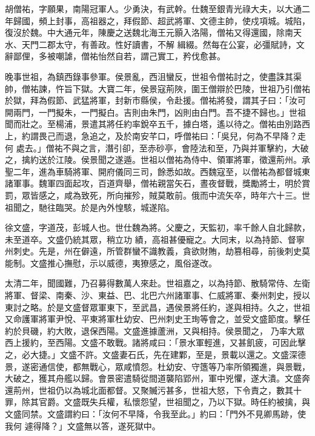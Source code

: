 
\begin{pinyinscope}

 胡僧祐，字願果，南陽冠軍人。少勇決，有武幹。仕魏至銀青光祿大夫，以大通二年歸國，頻上封事，高祖器之，拜假節、超武將軍、文德主帥，使戍項城。城陷，復沒於魏。中大通元年，陳慶之送魏北海王元顥入洛陽，僧祐又得還國，除南天水、天門二郡太守，有善政。性好讀書，不解
 緝綴。然每在公宴，必彊賦詩，文辭鄙俚，多被嘲謔，僧祐怡然自若，謂己實工，矜伐愈甚。



 晚事世祖，為鎮西錄事參軍。侯景亂，西沮蠻反，世祖令僧祐討之，使盡誅其渠帥，僧祐諫，忤旨下獄。大寶二年，侯景寇荊陜，圍王僧辯於巴陵，世祖乃引僧祐於獄，拜為假節、武猛將軍，封新市縣侯，令赴援。僧祐將發，謂其子曰：「汝可開兩門，一門擬朱，一門擬白。吉則由朱門，凶則由白門。吾不捷不歸也。」世祖聞而壯之。至楊浦，景遣其將任約率銳卒五千，據白塔，遙以待之。僧祐由別路西上，約謂畏己而退，急追之，及於南安芊口，呼僧祐曰：「吳兒，何為不早降？走何
 處去。」僧祐不與之言，潛引卻，至赤砂亭，會陸法和至，乃與并軍擊約，大破之，擒約送於江陵。侯景聞之遂遁。世祖以僧祐為侍中、領軍將軍，徵還荊州。承聖二年，進為車騎將軍、開府儀同三司，餘悉如故。西魏寇至，以僧祐為都督城東諸軍事。魏軍四面起攻，百道齊舉，僧祐親當矢石，晝夜督戰，獎勵將士，明於賞罰，眾皆感之，咸為致死，所向摧殄，賊莫敢前。俄而中流矢卒，時年六十三。世祖聞之，馳往臨哭。於是內外惶駭，城遂陷。



 徐文盛，字道茂，彭城人也。世仕魏為將。父慶之，天監初，率千餘人自北歸款，未至道卒。文盛仍統其眾，稍立功
 績，高祖甚優寵之。大同末，以為持節、督寧州刺史。先是，州在僻遠，所管群蠻不識教義，貪欲財賄，劫篡相尋，前後刺史莫能制。文盛推心撫慰，示以威德，夷獠感之，風俗遂改。



 太清二年，聞國難，乃召募得數萬人來赴。世祖嘉之，以為持節、散騎常侍、左衛將軍、督梁、南秦、沙、東益、巴、北巴六州諸軍事、仁威將軍、秦州刺史，授以東討之略。於是文盛督眾軍東下，至武昌，遇侯景將任約，遂與相持。久之，世祖又命護軍將軍尹悅、平東將軍杜幼安、巴州刺史王珣等會之，並受文盛節度。擊任約於貝磯，約大敗，退保西陽。文盛進據蘆洲，又與相持。侯景聞之，
 乃率大眾西上援約，至西陽。文盛不敢戰。諸將咸曰：「景水軍輕進，又甚飢疲，可因此擊之，必大捷。」文盛不許。文盛妻石氏，先在建鄴，至是，景載以還之。文盛深德景，遂密通信使，都無戰心，眾咸憤怨。杜幼安、守簉等乃率所領獨進，與景戰，大破之，獲其舟艦以歸。會景密遣騎從間道襲陷郢州，軍中兇懼，遂大潰。文盛奔還荊州，世祖仍以為城北面都督。又聚贓污甚多，世祖大怒，下令責之，數其十罪，除其官爵。文盛既失兵權，私懷怨望，世祖聞之，乃以下獄。時任約被擒，與文盛同禁。文盛謂約曰：「汝何不早降，令我至此。」約曰：「門外不見卿馬跡，使我何
 遽得降？」文盛無以答，遂死獄中。




\end{pinyinscope}
